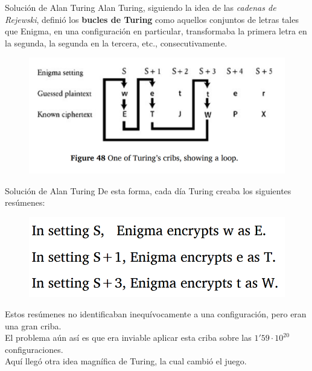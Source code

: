 \documentclass[aspectratio=169]{beamer}
\begin{document}
\begin{frame}{Solución de Alan Turing}
Alan Turing, siguiendo la idea de las \textit{cadenas de Rejewski}, definió los \textbf{bucles de Turing} como aquellos conjuntos de letras tales que Enigma, en una configuración en particular, transformaba la primera letra en la segunda, la segunda en la tercera, etc., consecutivamente.
\pause
\begin{figure}
	\centering
	\includegraphics[width=0.6\linewidth]{pic/bucleDeTuring}
\end{figure}
\end{frame}

\begin{frame}{Solución de Alan Turing}
	De esta forma, cada día Turing creaba los siguientes resúmenes:
	\pause
	\begin{figure}
		\centering
		\includegraphics[width=0.4\linewidth]{pic/bucleDeTuring1}
	\end{figure}
	Estos resúmenes no identificaban inequívocamente a una configuración, pero eran una gran criba.\\
	\pause
	El problema aún así es que era inviable aplicar esta criba sobre las $1'59\cdot 10^{20}$ configuraciones.\\
	Aquí llegó otra idea magnífica de Turing, la cual cambió el juego.
\end{frame}
\end{document}
